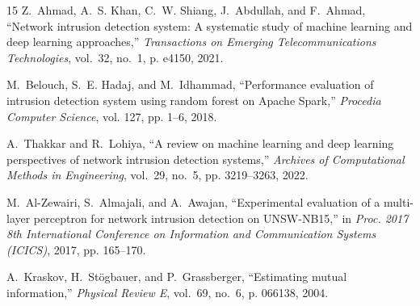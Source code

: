 \documentclass[conference]{IEEEtran}
\begin{document}
\begin{thebibliography}{15}
Z.~Ahmad, A.~S. Khan, C.~W. Shiang, J.~Abdullah, and F.~Ahmad, ``Network intrusion detection system: A systematic study of machine learning and deep learning approaches,'' \emph{Transactions on Emerging Telecommunications Technologies}, vol.~32, no.~1, p. e4150, 2021.

M.~Belouch, S.~E. Hadaj, and M.~Idhammad, ``Performance evaluation of intrusion detection system using random forest on {Apache Spark},'' \emph{Procedia Computer Science}, vol. 127, pp. 1--6, 2018.

A.~Thakkar and R.~Lohiya, ``A review on machine learning and deep learning perspectives of network intrusion detection systems,'' \emph{Archives of Computational Methods in Engineering}, vol.~29, no.~5, pp. 3219--3263, 2022.

M.~Al-Zewairi, S.~Almajali, and A.~Awajan, ``Experimental evaluation of a multi-layer perceptron for network intrusion detection on {UNSW-NB15},'' in \emph{Proc. 2017 8th International Conference on Information and Communication Systems (ICICS)}, 2017, pp. 165--170.

A.~Kraskov, H.~St{\"o}gbauer, and P.~Grassberger, ``Estimating mutual information,'' \emph{Physical Review E}, vol.~69, no.~6, p. 066138, 2004.

\end{thebibliography}
\end{document}
